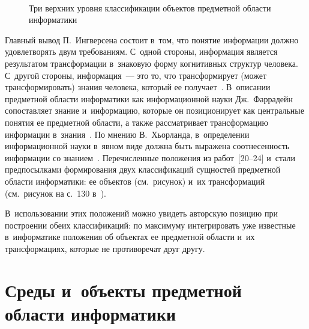 \begin{multicols}{2}
  \begin{figure*} %
     \vspace*{1pt}
\begin{center}
   \mbox{%
\epsfxsize=150.639mm 
}

\vspace*{4pt}

     {\small Три верхних уровня классификации объектов предметной области 
информатики}
\end{center}
\vspace*{-6pt}
     \end{figure*}
  
  Главный вывод П.~Ингверсена состоит в~том, что понятие информации 
должно удовлетворять двум требованиям. С~одной стороны, информация 
является результатом трансформации в~знаковую форму когнитивных структур 
человека. С~другой стороны, информация~--- это то, что трансформирует 
(может трансформировать) знания человека, который ее получает~\cite{22-zac}. 
В~описании предметной области информатики как информационной науки 
Дж.~Фаррадейн сопоставляет знание и~информацию, которые он 
позиционирует как центральные понятия ее предметной области, а также 
рассматривает трансформацию информации в~знания~\cite{23-zac}. По мнению 
В.~Хьорланда, в~определении информационной науки в~явном виде должна 
быть выражена соотнесенность информации со знанием~\cite{24-zac}. 
Перечисленные положения из работ~[20--24] и~стали предпосылками 
формирования двух классификаций сущностей предметной области 
информатики: ее объектов (см.\ рисунок) и~их трансформаций  
(см.\ рисунок на с.~130 в~\cite{15-zac}). 
  
  В~использовании этих положений можно увидеть авторскую позицию при 
построении обеих классификаций: по максимуму интегрировать уже известные в~информатике положения об объектах ее предметной области и~их 
трансформациях, которые не противоречат друг другу.

\vspace*{-6pt}
  
\section{Среды и~объекты предметной области информатики}

\vspace*{-3pt}


\end{multicols}
